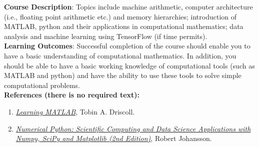 \documentclass[11pt]{article}
\begin{document}
 

{\bf Course Description}: Topics include machine arithmetic, computer architecture (i.e., floating point arithmetic etc.) and memory hierarchies; introduction of  MATLAB, python and their applications in computational mathematics; data analysis and machine learning using TensorFlow (if time permits).\\

{\bf Learning Outcomes}:  Successful completion of the course should enable you to have a basic understanding of computational mathematics. In addition, you should be able to have a basic working knowledge of  computational tools (such as MATLAB and python) and have the ability to use these tools to solve simple computational problems. \\

{\bf References  (there is no required text):}
 \begin{enumerate}[noitemsep,leftmargin=0.55cm]
\item  \href{https://www.amazon.com/Learning-MATLAB-Tobin-Driscoll/dp/0898716837}{\em Learning MATLAB},  Tobin A. Driscoll.   
\item  \href{https://www.amazon.com/Numerical-Python-Scientific-Applications-Matplotlib/dp/1484242459/ref=sr_1_fkmr0_1?keywords=Numerical+Python\%3A+Scientific+Computing+and+Data+Science+Applications+with+Numpy\%2C+SciPy+and+Matplotlib+2nd+ed.+Edition&qid=1565725702&s=gateway&sr=8-1-fkmr0}{\em Numerical Python: Scientific Computing and Data Science Applications with Numpy, SciPy and Matplotlib (2nd Edition)},  Robert Johansson.\\
\end{enumerate}





\end{document}
